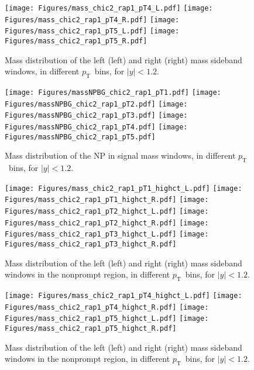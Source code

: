 \documentclass[12pt]{article}
\newcommand{\pt}{$p_{\mathrm{T}}$}
\begin{document}
\begin{figure}[htbp]
\centering
\texttt{[image: Figures/mass\_chic2\_rap1\_pT4\_L.pdf]}
\texttt{[image: Figures/mass\_chic2\_rap1\_pT4\_R.pdf]}
\texttt{[image: Figures/mass\_chic2\_rap1\_pT5\_L.pdf]}
\texttt{[image: Figures/mass\_chic2\_rap1\_pT5\_R.pdf]}
\caption{Mass distribution of the left (left) and
  right (right) mass sideband windows, in different
  \pt\ bins, for $|y| < 1.2$.}
\end{figure}
\clearpage

\begin{figure}[htbp]
\centering
\texttt{[image: Figures/massNPBG\_chic2\_rap1\_pT1.pdf]}
\texttt{[image: Figures/massNPBG\_chic2\_rap1\_pT2.pdf]}
\texttt{[image: Figures/massNPBG\_chic2\_rap1\_pT3.pdf]}
\texttt{[image: Figures/massNPBG\_chic2\_rap1\_pT4.pdf]}
\texttt{[image: Figures/massNPBG\_chic2\_rap1\_pT5.pdf]}
\caption{Mass distribution of the NP in signal mass
  windows, in different \pt\ bins, for $|y| < 1.2$.}
\end{figure}
\clearpage

\begin{figure}[htbp]
\centering
\texttt{[image: Figures/mass\_chic2\_rap1\_pT1\_highct\_L.pdf]}
\texttt{[image: Figures/mass\_chic2\_rap1\_pT1\_highct\_R.pdf]}
\texttt{[image: Figures/mass\_chic2\_rap1\_pT2\_highct\_L.pdf]}
\texttt{[image: Figures/mass\_chic2\_rap1\_pT2\_highct\_R.pdf]}
\texttt{[image: Figures/mass\_chic2\_rap1\_pT3\_highct\_L.pdf]}
\texttt{[image: Figures/mass\_chic2\_rap1\_pT3\_highct\_R.pdf]}
\caption{Mass distribution of the left (left) and
  right (right) mass sideband windows in the nonprompt region, in different
  \pt\ bins, for $|y| < 1.2$.}
\end{figure}
\clearpage

\begin{figure}[htbp]
\centering
\texttt{[image: Figures/mass\_chic2\_rap1\_pT4\_highct\_L.pdf]}
\texttt{[image: Figures/mass\_chic2\_rap1\_pT4\_highct\_R.pdf]}
\texttt{[image: Figures/mass\_chic2\_rap1\_pT5\_highct\_L.pdf]}
\texttt{[image: Figures/mass\_chic2\_rap1\_pT5\_highct\_R.pdf]}
\caption{Mass distribution of the left (left) and
  right (right) mass sideband windows in the nonprompt region, in different
  \pt\ bins, for $|y| < 1.2$.}
\end{figure}
\clearpage
\end{document}
